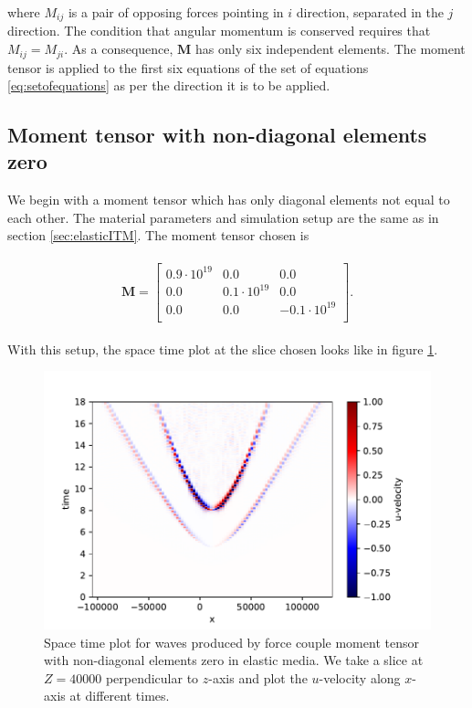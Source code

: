 where $M_{ij}$ is a pair of opposing forces pointing in $i$ direction, separated in the $j$ direction. The condition that angular momentum is conserved requires that $M_{ij} = M_{ji}$. As a consequence, $\mathbf{M}$ has only six independent elements. The moment tensor is applied to the first six equations of the set of equations \ref{eq:setofequations} as per the direction it is to be applied.
\subsection{Moment tensor with non-diagonal elements zero}
We begin with a moment tensor which has only diagonal elements not equal to each other. The material parameters and simulation setup are the same as in section \ref{sec:elasticITM}. The moment tensor chosen is

\begin{align}
    \begin{split}
        \mathbf{M} =
            \begin{bmatrix}
                0.9 \cdot10^{19} & 0.0 &0.0 \\
                0.0 & 0.1 \cdot 10^{19} & 0.0 \\
                0.0 & 0.0 & -0.1 \cdot 10^{19} \\
            \end{bmatrix} .
    \end{split}
\end{align}

With this setup, the space time plot at the slice chosen looks like in figure \ref{fig:space-timeplot-doublecouplediagnoITM}.

\begin{figure}[!htpb]
    \centering
    \includegraphics[width=0.75\linewidth]{figures/double-couple-diag-noITM.pdf}
    \caption{Space time plot for waves produced by force couple moment tensor with non-diagonal elements zero in elastic media. We take a slice at $Z=40000$ perpendicular to $z$-axis and plot the $u$-velocity along $x$-axis at different times.}
    \label{fig:space-timeplot-doublecouplediagnoITM}
\end{figure}

